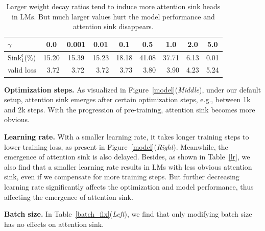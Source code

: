 \documentclass{article} \usepackage{iclr2025_conference,times}
\begin{document}
\begin{table}[t]
\vspace{-1.1cm}
\caption{Larger weight decay ratios tend to induce more attention sink heads in LMs. But much larger values hurt the model performance and attention sink disappears.}
\vspace{-.4cm}
\begin{center}
\begin{tabular}{l|cccccccc}
\toprule
$\gamma$ & 0.0 & 0.001 & 0.01 & 0.1 & 0.5 & 1.0 & 2.0 & 5.0\\
\midrule
$\textrm{Sink}_1^{\epsilon}$(\%)  & 15.20 & 15.39 & 15.23 & 18.18 & 41.08 & 37.71 & 6.13 &  0.01\\
valid loss & \,\,\,3.72 & \,\,\,3.72 & \,\,\,3.72 & \,\,\,3.73 & \,\,\,3.80  & \,\,\,3.90 &  4.23 & 5.24\\
\bottomrule
\end{tabular}
\end{center}
\vspace{-.5cm}
\label{decay}
\end{table}













\textbf{Optimization steps.} As visualized in Figure~\ref{model}(\emph{Middle}), under our default setup, attention sink emerges after certain optimization steps, e.g., between 1k and 2k steps. With the progression of pre-training, attention sink becomes more obvious. 

\textbf{Learning rate.} With a smaller learning rate, it takes longer training steps to lower training loss, as present in Figure~\ref{model}(\emph{Right}). Meanwhile, the emergence of attention sink is also delayed. Besides, as shown in Table~\ref{lr}, we also find that a smaller learning rate results in LMs with less obvious attention sink, even if we compensate for more training steps.  But further decreasing learning rate significantly affects the optimization and model performance, thus affecting the emergence of attention sink.

\textbf{Batch size.} In Table~\ref{batch_fix}(\emph{Left}), we find that only modifying batch size has no effects on attention sink.
\end{document}
